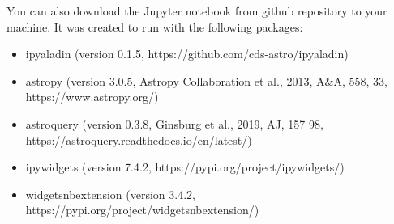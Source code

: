 \documentclass [a4paper, 12pt]{article}
\begin{document}
You can also download the Jupyter notebook from github repository to your 
machine. It was created to run with the following packages:
\begin{itemize}
    \item ipyaladin (version 0.1.5, https://github.com/cds-astro/ipyaladin)
    \item astropy (version 3.0.5, Astropy Collaboration et al., 2013, A\&A, 
    558, 33, https://www.astropy.org/)
    \item astroquery (version 0.3.8, Ginsburg et al., 2019, AJ, 157 98, 
    https://astroquery.readthedocs.io/en/latest/)
    \item ipywidgets (version 7.4.2, https://pypi.org/project/ipywidgets/)
    \item widgetsnbextension (version 3.4.2, 
    https://pypi.org/project/widgetsnbextension/)
\end{itemize}
\end{document}
